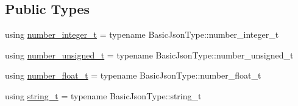 \subsection*{Public Types}
\begin{DoxyCompactItemize}
\item 
using \hyperlink{classnlohmann_1_1detail_1_1json__sax__acceptor_a41876b17c0e8bdb55580eaf5e4e2ded8}{number\+\_\+integer\+\_\+t} = typename Basic\+Json\+Type\+::number\+\_\+integer\+\_\+t
\item 
using \hyperlink{classnlohmann_1_1detail_1_1json__sax__acceptor_ae07454608ea6f3cfb765f95e3c850043}{number\+\_\+unsigned\+\_\+t} = typename Basic\+Json\+Type\+::number\+\_\+unsigned\+\_\+t
\item 
using \hyperlink{classnlohmann_1_1detail_1_1json__sax__acceptor_a5502f483fc60a1bcd73e0e46b6ab36e4}{number\+\_\+float\+\_\+t} = typename Basic\+Json\+Type\+::number\+\_\+float\+\_\+t
\item 
using \hyperlink{classnlohmann_1_1detail_1_1json__sax__acceptor_a3a8078bbf865ec355106f6048241609a}{string\+\_\+t} = typename Basic\+Json\+Type\+::string\+\_\+t
\end{DoxyCompactItemize}
